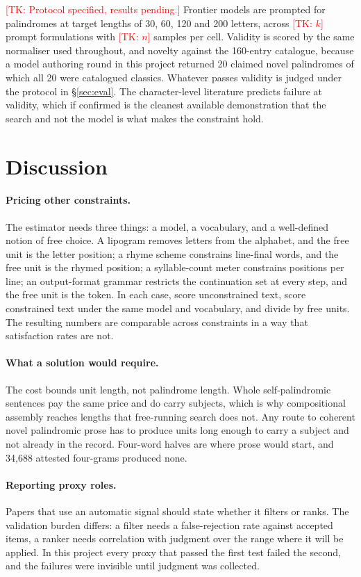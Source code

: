 \documentclass[11pt]{article}
\newif\ifprovenance\provenancetrue
\newcommand{\tk}[1]{\ifprovenance\textcolor{red}{[TK: #1]}\else#1\fi}
\begin{document}
\tk{Protocol specified, results pending.} Frontier models are prompted for
palindromes at target lengths of 30, 60, 120 and 200 letters, across
\tk{$k$} prompt formulations with \tk{$n$} samples per cell. Validity is scored
by the same normaliser used throughout, and novelty against the 160-entry
catalogue, because a model authoring round in this project returned 20 claimed
novel palindromes of which all 20 were catalogued classics. Whatever passes
validity is judged under the protocol in \S\ref{sec:eval}. The
character-level literature \citep{edman2024} predicts failure at validity,
which if confirmed is the cleanest available demonstration that the search and
not the model is what makes the constraint hold.

\section{Discussion}

\paragraph{Pricing other constraints.}
The estimator needs three things: a model, a vocabulary, and a well-defined
notion of free choice. A lipogram removes letters from the alphabet, and the
free unit is the letter position; a rhyme scheme constrains line-final words,
and the free unit is the rhymed position; a syllable-count meter constrains
positions per line; an output-format grammar restricts the continuation set at
every step, and the free unit is the token. In each case, score unconstrained
text, score constrained text under the same model and vocabulary, and divide by
free units. The resulting numbers are comparable across constraints in a way
that satisfaction rates are not.

\paragraph{What a solution would require.}
The cost bounds unit length, not palindrome length. Whole self-palindromic
sentences pay the same price and do carry subjects, which is why compositional
assembly reaches lengths that free-running search does not. Any route to
coherent novel palindromic prose has to produce units long enough to carry a
subject and not already in the record. Four-word halves are where prose would
start, and 34{,}688 attested four-grams produced none.

\paragraph{Reporting proxy roles.}
Papers that use an automatic signal should state whether it filters or ranks.
The validation burden differs: a filter needs a false-rejection rate against
accepted items, a ranker needs correlation with judgment over the range where
it will be applied. In this project every proxy that passed the first test
failed the second, and the failures were invisible until judgment was
collected.
\end{document}
